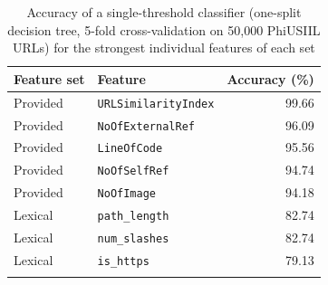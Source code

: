 \begin{table}[h]
\caption{Accuracy of a single-threshold classifier (one-split decision tree, 5-fold cross-validation on 50,000 PhiUSIIL URLs) for the strongest individual features of each set}\label{tab:features}%
\begin{tabular}{@{}llr@{}}
\toprule
Feature set & Feature & Accuracy (\%) \\
\midrule
Provided & \texttt{URLSimilarityIndex} & 99.66 \\
Provided & \texttt{NoOfExternalRef} & 96.09 \\
Provided & \texttt{LineOfCode} & 95.56 \\
Provided & \texttt{NoOfSelfRef} & 94.74 \\
Provided & \texttt{NoOfImage} & 94.18 \\
Lexical & \texttt{path\_length} & 82.74 \\
Lexical & \texttt{num\_slashes} & 82.74 \\
Lexical & \texttt{is\_https} & 79.13 \\
\botrule
\end{tabular}
\end{table}

